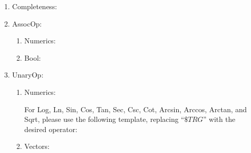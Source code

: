 
\begin{enumerate}

    \item Completeness:
        \newrule{}
            {}
        
        \newrule{}
            {}

    \item AssocOp:
        \begin{enumerate}
            \item Numerics:
                    {}
        
                    {}
    
            \item Bool:
                \newrule{}
                    {}
        
                \newrule{}
                    {}
        \end{enumerate}

    \item UnaryOp:
        \begin{enumerate}
            \item Numerics:
                    {}

                    {}
                
                
                For Log, Ln, Sin, Cos, Tan, Sec, Csc, Cot, Arcsin, Arccos, Arctan, and Sqrt, please use the following template, replacing ``$\$TRG$'' with the desired operator:
                \newrule{}
                    {}


            \item Vectors:
                    {}

                    {}


\end{enumerate}
\end{enumerate}
